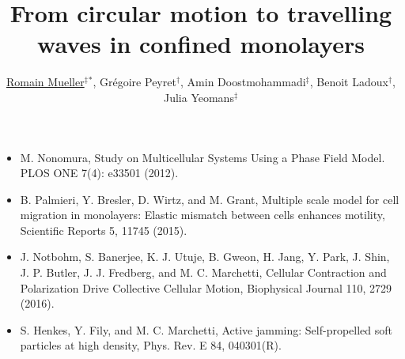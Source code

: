 \documentclass[a0,portrait]{a0poster}
\title{From circular motion to travelling waves in confined monolayers}
\author{\underline{Romain Mueller}${}^\ddagger{}^*$, Gr\'egoire Peyret${}^\dagger$, Amin Doostmohammadi${}^\ddagger$, Benoit Ladoux${}^\dagger$, Julia Yeomans${}^\ddagger$}
\begin{document}
\makeheader

\begin{posterrow}{2}

\begin{posterbox}

\end{posterbox}

\begin{posterbox}

\begin{itemize}
  \item M. Nonomura, Study on Multicellular Systems Using a Phase Field Model. PLOS ONE 7(4): e33501 (2012).
  \item B. Palmieri, Y. Bresler, D. Wirtz, and M. Grant, Multiple scale model for cell migration in monolayers: Elastic mismatch between cells enhances motility, Scientific Reports 5, 11745 (2015).
  \item J. Notbohm, S. Banerjee, K. J. Utuje, B. Gweon, H. Jang, Y. Park, J. Shin, J. P. Butler, J. J. Fredberg, and M. C. Marchetti, Cellular Contraction and Polarization Drive Collective Cellular Motion, Biophysical Journal 110, 2729 (2016).
  \item S. Henkes, Y. Fily, and M. C. Marchetti, Active jamming: Self-propelled soft particles at high density, Phys. Rev. E 84, 040301(R).
\end{itemize}
\vspace{68.5mm}

\end{posterbox}

\end{posterrow}

\vfill\makefooter
\end{document}
